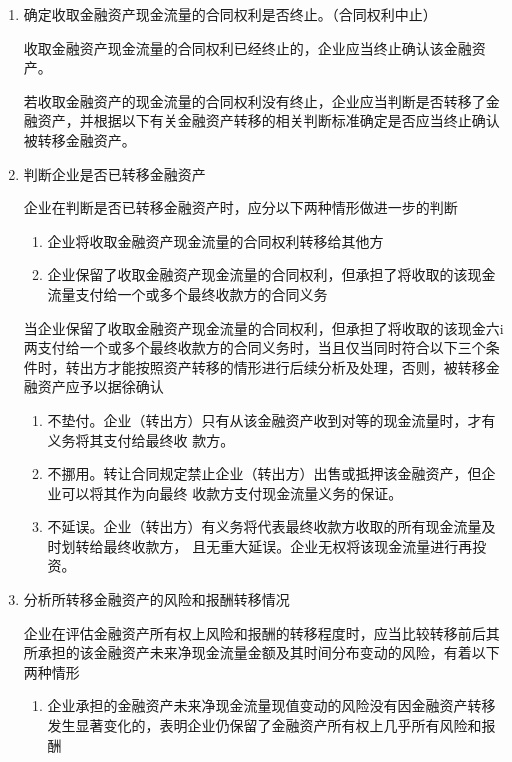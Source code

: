 \documentclass[UTF8,12pt]{ctexart}
\numberwithin{equation}{section} %
\numberwithin{figure}{section}
\numberwithin{table}{section}
\begin{document}
\begin{enumerate}
		\item 确定收取金融资产现金流量的合同权利是否终止。（合同权利中止）
		
		收取金融资产现金流量的合同权利已经终止的，企业应当终止确认该金融资产。
		
		若收取金融资产的现金流量的合同权利没有终止，企业应当判断是否转移了金融资产，并根据以下有关金融资产转移的相关判断标准确定是否应当终止确认被转移金融资产。
		
		\item 判断企业是否已转移金融资产
		
		企业在判断是否已转移金融资产时，应分以下两种情形做进一步的判断
		\begin{enumerate}
			\item 企业将收取金融资产现金流量的合同权利转移给其他方
			
			\item 企业保留了收取金融资产现金流量的合同权利，但承担了将收取的该现金流量支付给一个或多个最终收款方的合同义务
		\end{enumerate}
		
		当企业保留了收取金融资产现金流量的合同权利，但承担了将收取的该现金六i两支付给一个或多个最终收款方的合同义务时，当且仅当同时符合以下三个条件时，转出方才能按照资产转移的情形进行后续分析及处理，否则，被转移金融资产应予以据徐确认
		\begin{enumerate}
			\item 不垫付。企业（转出方）只有从该金融资产收到对等的现金流量时，才有义务将其支付给最终收
			款方。
			
			\item 不挪用。转让合同规定禁止企业（转出方）出售或抵押该金融资产，但企业可以将其作为向最终
			收款方支付现金流量义务的保证。
			
			\item 不延误。企业（转出方）有义务将代表最终收款方收取的所有现金流量及时划转给最终收款方，
			且无重大延误。企业无权将该现金流量进行再投资。
		\end{enumerate}
		
		\item 分析所转移金融资产的风险和报酬转移情况
		
		企业在评估金融资产所有权上风险和报酬的转移程度时，应当比较转移前后其所承担的该金融资产未来净现金流量金额及其时间分布变动的风险，有着以下两种情形
		\begin{enumerate}
			\item 企业承担的金融资产未来净现金流量现值变动的风险没有因金融资产转移发生显著变化的，表明企业仍保留了金融资产所有权上几乎所有风险和报酬
			

\end{enumerate}
\end{enumerate}
\end{document}
